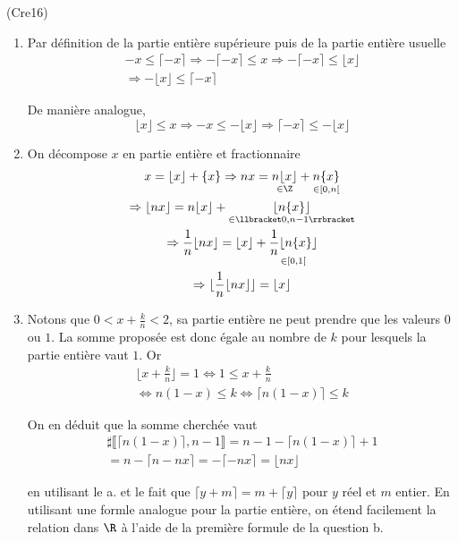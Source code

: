 \begin{tiny}(Cre16)\end{tiny}
\begin{enumerate}
 \item Par définition de la partie entière supérieure puis de la partie entière usuelle 
\begin{multline*}
-x \leq \lceil -x \rceil \Rightarrow - \lceil -x \rceil \leq x
\Rightarrow - \lceil -x \rceil \leq \lfloor x \rfloor\\
\Rightarrow - \lfloor x \rfloor \leq \lceil -x \rceil
\end{multline*}

De manière analogue,
\begin{displaymath}
\lfloor x \rfloor \leq x \Rightarrow  -x\leq - \lfloor x \rfloor 
\Rightarrow  \lceil -x \rceil \leq  -\lfloor x \rfloor
\end{displaymath}
\item On décompose $x$ en partie entière et fractionnaire
\begin{multline*}
 x = \lfloor x \rfloor + \{x\}\Rightarrow nx = \underset{\in \Z}{n\lfloor x \rfloor} + \underset{\in [0,n[}{n\{x\}}\\
\Rightarrow \lfloor nx \rfloor = n\lfloor x \rfloor + \underset{\in \llbracket 0,n-1\rrbracket }{\lfloor n\{x\}\rfloor}\\
\Rightarrow \frac{1}{n} \lfloor nx \rfloor = \lfloor x \rfloor + \underset{\in [0,1[}{\frac{1}{n}\lfloor n\{x\}\rfloor}\\
\Rightarrow \lfloor \frac{1}{n} \lfloor nx \rfloor \rfloor = \lfloor x \rfloor
\end{multline*}

\item Notons que $0< x+\frac{k}{n}<2$, sa partie entière ne peut prendre que les valeurs $0$ ou $1$. La somme proposée est donc égale au nombre de $k$ pour lesquels la partie entière vaut $1$. Or
\begin{multline*}
 \lfloor x+\frac{k}{n} \rfloor =1
\Leftrightarrow 1\leq x+\frac{k}{n} \\
\Leftrightarrow n(1-x)\leq k \Leftrightarrow \lceil n(1-x) \rceil \leq k 
\end{multline*}

On en déduit que la somme cherchée vaut
\begin{multline*}
 \sharp \llbracket \lceil n(1-x) \rceil , n-1 \rrbracket
= n-1 - \lceil n(1-x) \rceil +1 \\
= n - \lceil n -nx \rceil
= - \lceil -nx \rceil = \lfloor nx \rfloor
\end{multline*}

en utilisant le a. et le fait que $\lceil y+m \rceil = m+\lceil y \rceil$ pour $y$ réel et $m$ entier. En utilisant une formle analogue pour la partie entière, on étend facilement la relation dans $\R$ à l'aide de la première formule de la question b.
\end{enumerate}
